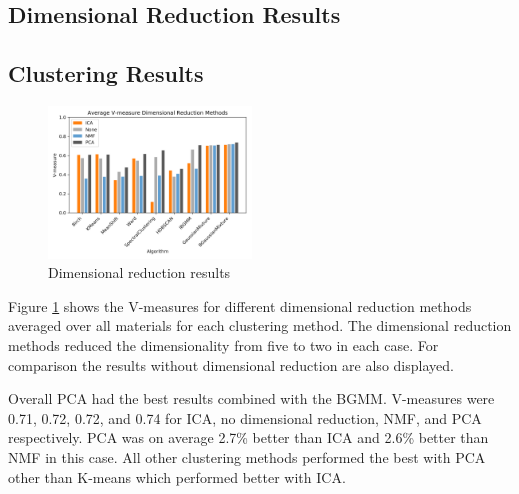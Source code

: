 \documentclass[a4paper,11pt]{article}
\begin{document}
\subsection{Dimensional Reduction Results}

\subsection{Clustering Results}

\begin{figure}
  
  \begin{center}
    \includegraphics[width=0.48\textwidth]{figures/red_methods.png}
  \end{center}
  
  \caption{Dimensional reduction results}
  
  \label{results:dr}
\end{figure}

Figure \ref{results:dr} shows the V-measures for different dimensional reduction methods averaged over all materials for each clustering method. The dimensional reduction methods reduced the dimensionality from five to two in each case. For comparison the results without dimensional reduction are also displayed.

Overall PCA had the best results combined with the BGMM. V-measures were 0.71, 0.72, 0.72, and 0.74 for ICA, no dimensional reduction, NMF, and PCA respectively. PCA was on average 2.7\% better than ICA and 2.6\% better than NMF in this case. All other clustering methods performed the best with PCA other than K-means which performed better with ICA.

\end{document}
